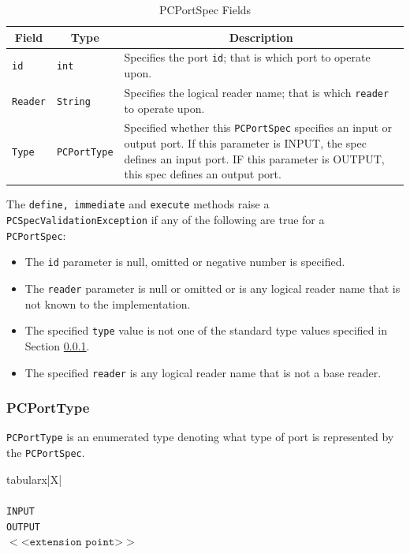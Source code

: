 \documentclass[11pt,a4paper,oneside]{article}
\newenvironment{bbox}%
{\begin{table}[h!]\begin{threeparttable}}%
{\end{threeparttable}\end{table}\FloatBarrier}
\newenvironment{bbox}
{\ifvmode\IgnorePar\fi \EndP\Tg<div class='bbox'>}{\Tg</div>\IgnoreIndent}
\begin{document}
\begin{table}[!h]
\begin{tabularx}{\linewidth}{|l|l|X|}
\hline
\multicolumn{1}{|c|}{\textbf{Field}}&\multicolumn{1}{c|}{\textbf{Type}}&\multicolumn{1}{c|}{\textbf{Description}}\\
\hline 
\texttt{id} &\texttt{int}&Specifies the port \texttt{id}; that is which port to operate upon.\\ \hline 
\texttt{Reader} &\texttt{String}&Specifies the logical reader name; that is which \texttt{reader} to operate upon.\\ \hline 
\texttt{Type} &\texttt{PCPortType}&Specified whether this \texttt{PCPortSpec} specifies an input or output port. If this parameter is INPUT, the spec defines an input port. IF this parameter is OUTPUT, this spec defines an output port.\\ \hline 
\end{tabularx}
\caption{PCPortSpec Fields}
\MakeLineNo
\end{table}
\FloatBarrier

The \texttt{define, immediate} and \texttt{execute} methods raise a \ifpdf\\\fi\texttt{PCSpecValidationException} if any of the following are true for a \ifpdf\\\fi\texttt{PCPortSpec}:
\begin{itemize}
\item	The \texttt{id} parameter is null, omitted or negative number is specified.
\item	The \texttt{reader} parameter is null or omitted or is any logical reader name that is not known to the implementation.
\item	The specified \texttt{type} value is not one of the standard type values specified in Section \ref{subsec: PCPort}.
\item	The specified \texttt{reader} is any logical reader name that is not a base reader.
\end{itemize}

\subsubsection{PCPortType}
\label{subsec: PCPort}
\texttt{PCPortType} is an enumerated type denoting what type of port is represented by the \texttt{PCPortSpec}.

\begin{bbox}
\begin{edtable}{tabularx}{\linewidth}{|X|}
\hline 
{}
\\
\\
\texttt{INPUT}\\
\texttt{OUTPUT}\\
$<$<$\texttt{extension point}$>$>$\\
\hline
\end{edtable}
\end{bbox}
\end{document}
